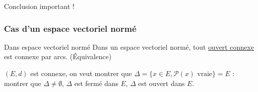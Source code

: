 \begin{note}{}{}
Conclusion important !
\end{note}


\subsubsection{Cas d'un espace vectoriel normé} %
\label{sec:Cas d'un espace vectoriel normé}


\begin{Theorem}{Dans espace vectoriel normé}{}
Dans un espace vectoriel normé, tout \underline{ouvert connexe} est connexe par arcs. (Équivalence)
\end{Theorem}

\begin{note}{}{}
$(E, d)$ est connexe, on veut montrer que $\Delta = \{x\in E, \mathcal{P}(x) \text{ vraie}\} = E$ : montrer que $\Delta \ne \emptyset$, $\Delta$ est fermé dans $E$, $\Delta$ est ouvert dans $E$.
\end{note}

